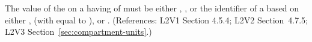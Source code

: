 The value of the   on a \Compartment having
 of  must be either ,
, or the identifier of a \UnitDefinition based on either
,  (with  equal to ), or
.  (References: L2V1 Section 4.5.4; L2V2
Section~4.7.5; L2V3 Section~\ref{sec:compartment-units}.)
